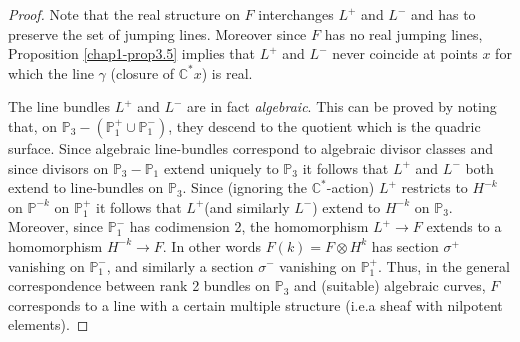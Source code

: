 \begin{proof}
Note that the real structure on $F$ interchanges $L^{+}$ and $L^{-}$
and has to preserve the set of jumping lines. Moreover since $F$ has
no real jumping lines, Proposition \ref{chap1-prop3.5} implies that
$L^{+}$ and $L^{-}$ never coincide at points $x$ for which the line
$\gamma$ (closure of $\mathbb{C}^{*}x$) is real. 

The line bundles $L^{+}$ and $L^{-}$ are in fact {\em algebraic}. This
can be proved by noting that, on
$\mathbb{P}_{3}-(\mathbb{P}^{+}_{1}\cup\mathbb{P}^{-}_{1})$, they
descend to the quotient which is the quadric surface. Since algebraic
line-bundles correspond to algebraic divisor classes and since
divisors on $\mathbb{P}_{3}-\mathbb{P}_{1}$ extend uniquely to
$\mathbb{P}_{3}$ it follows that $L^{+}$ and $L^{-}$ both extend to
line-bundles on $\mathbb{P}_{3}$. Since (ignoring the $\mathbb{C}^{*}$-action) 
$L^+$ restricts to $H^{-k}$ on $\mathbb{P}^{-k}$ on $\mathbb{P}^+_1$ it follows that
$L^+$(and similarly $L^-$) extend to $H^{-k}$ on $\mathbb{P}_3$. 
Moreover, since $\mathbb{P}^{-}_{1}$
has codimension 2, the homomorphism $L^{+}\to F$ extends to a
homomorphism $H^{-k}\to F$. In other words $F(k)=F\otimes H^{k}$ has 
section $\sigma^{+}$ vanishing on $\mathbb{P}^{-}_{1}$, and similarly
a section $\sigma^{-}$ vanishing on $\mathbb{P}^{+}_{1}$. Thus, in the
general correspondence between rank 2 bundles on $\mathbb{P}_{3}$ and
(suitable) algebraic curves, $F$ corresponds to a line with a certain
multiple structure (i.e.\@ a sheaf with nilpotent elements). 


\end{proof}
